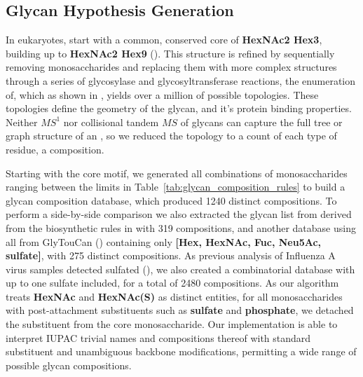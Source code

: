 \subsection{Glycan Hypothesis Generation}
    In eukaryotes, \nglycans start with a common, conserved core of \textbf{HexNAc2 Hex3},
    building up to \textbf{HexNAc2 Hex9} (\cite{Stanley2009}). This structure is refined by
    sequentially removing monosaccharides and replacing them with more complex structures
    through a series of glycosylase and glycosyltransferase reactions, the enumeration of,
    which as shown in \cite{Akune2016}, yields over a million of possible \nglycan topologies.
    These topologies define the geometry of the glycan, and it's protein binding properties.
    Neither $MS^1$ nor collisional tandem $MS$ of glycans can capture the full tree or
    graph structure of an \nglycan, so we reduced the topology to a count of each type of residue,
    a composition.

    Starting with the core motif, we generated all combinations of monosaccharides ranging
    between the limits in Table~\ref{tab:glycan_composition_rules} to build a glycan composition
    database, which produced 1240 distinct compositions. To perform a side-by-side comparison we
    also extracted the glycan list from \cite{Yu2013} derived from the biosynthetic rules in
    \cite{Krambeck2005} with 319 compositions, and another database using all \nglycans from
    GlyTouCan (\cite{Tiemeyer2017}) containing only \textbf{[Hex, HexNAc, Fuc, Neu5Ac, sulfate]},
    with 275 distinct compositions. As previous analysis of Influenza A virus samples detected
    sulfated \nglycans (\cite{Khatri2016a}), we also created a combinatorial database with up to
    one sulfate included, for a total of 2480 compositions. As our algorithm treats \textbf{HexNAc}
    and \textbf{HexNAc(S)} as distinct entities, for all monosaccharides with post-attachment
    substituents such as \textbf{sulfate} and \textbf{phosphate}, we detached the substituent
    from the core monosaccharide. Our implementation is able to interpret IUPAC trivial names
    and compositions thereof with standard substituent and unambiguous backbone modifications,
    permitting a wide range of possible glycan compositions.

